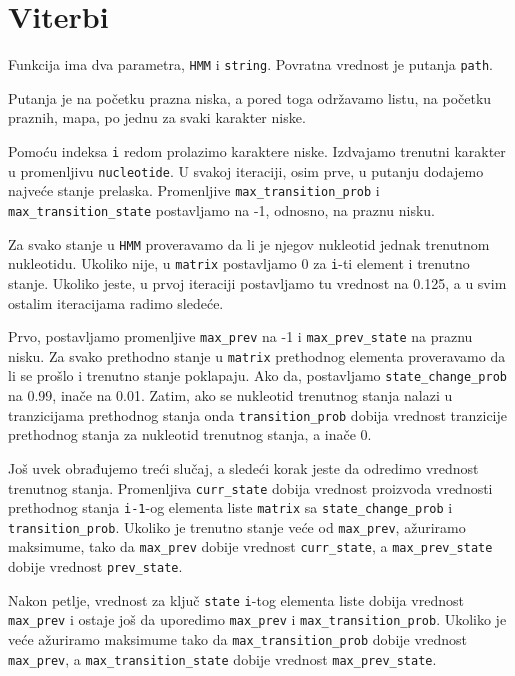 \section{Viterbi}


Funkcija ima dva parametra, \texttt{HMM} i \texttt{string}. Povratna vrednost je putanja \texttt{path}.

Putanja je na početku prazna niska, a pored toga održavamo listu, na početku praznih, mapa, po jednu za svaki karakter niske. 

Pomoću indeksa \texttt{i} redom prolazimo karaktere niske. Izdvajamo trenutni karakter u promenljivu \texttt{nucleotide}. U svakoj iteraciji, osim prve, u putanju dodajemo najveće stanje prelaska. Promenljive \texttt{max\_transition\_prob} i \texttt{max\_transition\_state} postavljamo na -1, odnosno, na praznu nisku.

Za svako stanje u \texttt{HMM} proveravamo da li je njegov nukleotid jednak trenutnom nukleotidu. Ukoliko nije, u \texttt{matrix} postavljamo 0 za \texttt{i}-ti element i trenutno stanje. Ukoliko jeste, u prvoj iteraciji postavljamo tu vrednost na 0.125, a u svim ostalim iteracijama radimo sledeće.

Prvo, postavljamo promenljive \texttt{max\_prev} na -1 i \texttt{max\_prev\_state} na praznu nisku. Za svako prethodno stanje u \texttt{matrix} prethodnog elementa proveravamo da li se prošlo i trenutno stanje poklapaju. Ako da, postavljamo \texttt{state\_change\_prob} na 0.99, inače na 0.01. Zatim, ako se nukleotid trenutnog stanja nalazi u tranzicijama prethodnog stanja onda \texttt{transition\_prob} dobija vrednost tranzicije prethodnog stanja za nukleotid trenutnog stanja, a inače 0.

Još uvek obrađujemo treći slučaj, a sledeći korak jeste da odredimo vrednost trenutnog stanja. Promenljiva \texttt{curr\_state} dobija vrednost proizvoda  vrednosti prethodnog stanja \texttt{i-1}-og elementa liste \texttt{matrix} sa \texttt{state\_change\_prob} i \texttt{transition\_prob}. Ukoliko je trenutno stanje veće od \texttt{max\_prev}, ažuriramo maksimume, tako da \texttt{max\_prev} dobije vrednost \texttt{curr\_state}, a \texttt{max\_prev\_state} dobije vrednost \texttt{prev\_state}.

Nakon petlje, vrednost za ključ \texttt{state} \texttt{i}-tog elementa liste dobija vrednost \texttt{max\_prev} i ostaje još da uporedimo \texttt{max\_prev} i \texttt{max\_transition\_prob}. Ukoliko je veće ažuriramo maksimume tako da \texttt{max\_transition\_prob} dobije vrednost \texttt{max\_prev}, a \texttt{max\_transition\_state} dobije vrednost \texttt{max\_prev\_state}.

